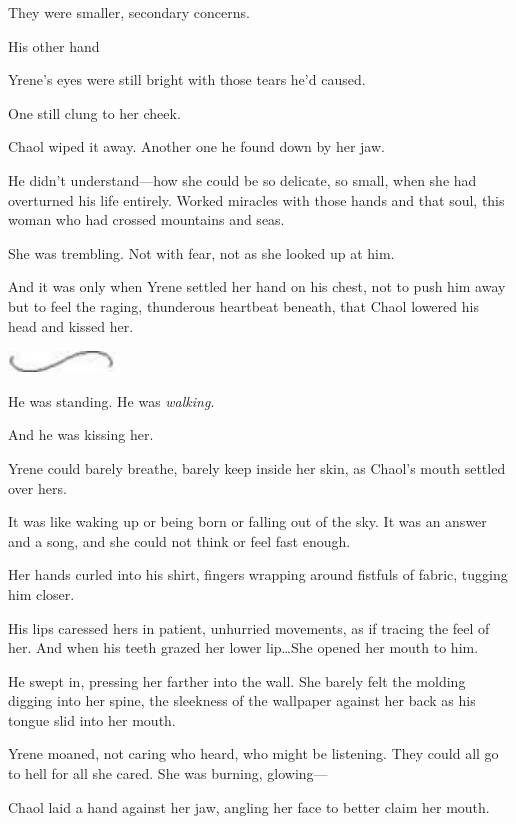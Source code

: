 They were smaller, secondary concerns.

His other hand 

Yrene's eyes were still bright with those tears he'd caused.

One still clung to her cheek.

Chaol wiped it away.
Another one he found down by her jaw.

He didn't understand---how she could be so delicate, so small, when she had overturned his life entirely.
Worked miracles with those hands and that soul, this woman who had crossed mountains and seas.

She was trembling.
Not with fear, not as she looked up at him.

And it was only when Yrene settled her hand on his chest, not to push him away but to feel the raging, thunderous heartbeat beneath, that Chaol lowered his head and kissed her.

\begin{center}
	\includegraphics[width=1.12in,height=0.24in]{images/seperator}
\end{center}

He was standing.
He was \emph{walking}.

And he was kissing her.

Yrene could barely breathe, barely keep inside her skin, as Chaol's mouth settled over hers.

It was like waking up or being born or falling out of the sky.
It was an answer and a song, and she could not think or feel fast enough.

Her hands curled into his shirt, fingers wrapping around fistfuls of fabric, tugging him closer.

His lips caressed hers in patient, unhurried movements, as if tracing the feel of her.
And when his teeth grazed her lower lip\ldots She opened her mouth to him.

He swept in, pressing her farther into the wall.
She barely felt the molding digging into her spine, the sleekness of the wallpaper against her back as his tongue slid into her mouth.

Yrene moaned, not caring who heard, who might be listening.
They could all go to hell for all she cared.
She was burning, glowing---

Chaol laid a hand against her jaw, angling her face to better claim her mouth.

